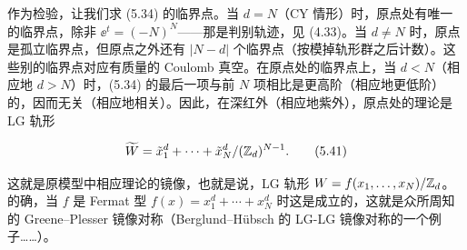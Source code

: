 
作为检验，让我们求 (5.34) 的临界点。当 $d=N$（CY 情形）时，原点处有唯一的临界点，除非 $\ee^t=(-N)^N$——那是判别轨迹，见 (4.33)。当 $d\neq N$ 时，原点是孤立临界点，但原点之外还有 $|N-d|$ 个临界点（按模掉轨形群之后计数）。这些别的临界点对应有质量的 Coulomb 真空。在原点处的临界点上，当 $d<N$（相应地 $d>N$）时，(5.34) 的最后一项与前 $N$ 项相比是更高阶（相应地更低阶）的，因而无关（相应地相关）。因此，在深红外（相应地紫外），原点处的理论是 LG 轨形

\begin{equation}
	\widetilde{W} = \tilde x_1^d+\cdots+\tilde x_N^d/(\mathbb{Z}_d)^{N-1}. \tag{5.41}
\end{equation}

这就是原模型中相应理论的镜像，也就是说，LG 轨形 $W=f(x_1,\dots,x_N)/\mathbb{Z}_d$。的确，当 $f$ 是 Fermat 型 $f(x)=x_1^d+\cdots+x_N^d$ 时这是成立的，这就是众所周知的 Greene–Plesser 镜像对称（Berglund–Hübsch 的 LG-LG 镜像对称的一个例子……）。

